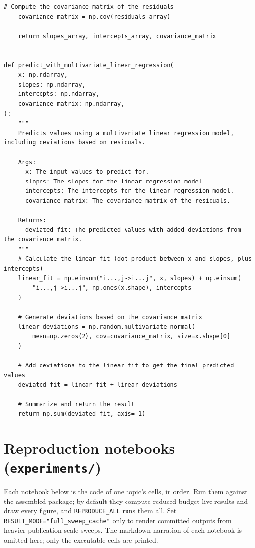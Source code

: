 \begin{lstlisting}[caption={mnn\_torch/utils.py},label={lst:mnn-src-utils}]
    # Compute the covariance matrix of the residuals
    covariance_matrix = np.cov(residuals_array)

    return slopes_array, intercepts_array, covariance_matrix


def predict_with_multivariate_linear_regression(
    x: np.ndarray,
    slopes: np.ndarray,
    intercepts: np.ndarray,
    covariance_matrix: np.ndarray,
):
    """
    Predicts values using a multivariate linear regression model, including deviations based on residuals.

    Args:
    - x: The input values to predict for.
    - slopes: The slopes for the linear regression model.
    - intercepts: The intercepts for the linear regression model.
    - covariance_matrix: The covariance matrix of the residuals.

    Returns:
    - deviated_fit: The predicted values with added deviations from the covariance matrix.
    """
    # Calculate the linear fit (dot product between x and slopes, plus intercepts)
    linear_fit = np.einsum("i...,j->i...j", x, slopes) + np.einsum(
        "i...,j->i...j", np.ones(x.shape), intercepts
    )

    # Generate deviations based on the covariance matrix
    linear_deviations = np.random.multivariate_normal(
        mean=np.zeros(2), cov=covariance_matrix, size=x.shape[0]
    )

    # Add deviations to the linear fit to get the final predicted values
    deviated_fit = linear_fit + linear_deviations

    # Summarize and return the result
    return np.sum(deviated_fit, axis=-1)
\end{lstlisting}

\section{Reproduction notebooks (\texttt{experiments/})}
\label{app:mnn-nb}

\noindent Each notebook below is the code of one topic's cells, in order. Run them against the assembled package; by default they compute reduced-budget live results and draw every figure, and \texttt{REPRODUCE\_ALL} runs them all. Set \texttt{RESULT\_MODE="full\_sweep\_cache"} only to render committed outputs from heavier publication-scale sweeps. The markdown narration of each notebook is omitted here; only the executable cells are printed.

